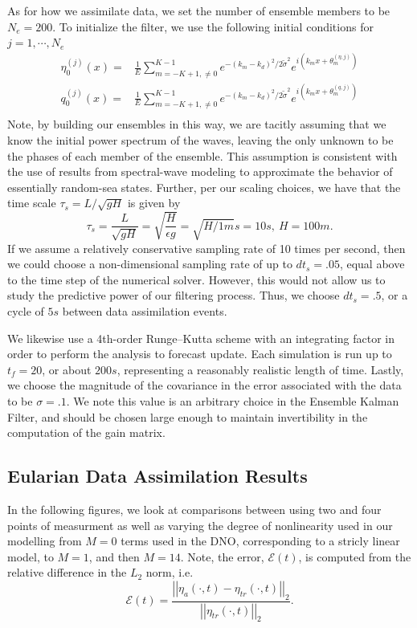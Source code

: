 As for how we assimilate data, we set the number of ensemble members to be $N_{e}=200$.  To initialize the filter, we use the following initial conditions for $j=1,\cdots,N_{e}$   
\begin{align*}
	\eta^{(j)}_{0}(x) = & \frac{1}{E}\sum_{m=-K+1,\neq0}^{K-1} e^{-\left(k_{m}-k_{d}\right)^{2}/2\tilde{\sigma}^{2}}e^{i(k_{m}x+\theta^{(\eta,j)}_{m})}\\
	q^{(j)}_{0}(x) = & \frac{1}{E}\sum_{m=-K+1,\neq0}^{K-1} e^{-\left(k_{m}-k_{d}\right)^{2}/2\tilde{\sigma}^{2}}e^{i(k_{m}x+\theta^{(q,j)}_{m})}\\
\end{align*}
Note, by building our ensembles in this way, we are tacitly assuming that we know the initial power spectrum of the waves, leaving the only unknown to be the phases of each member of the ensemble.  This assumption is consistent with the use of results from spectral-wave modeling to approximate the behavior of essentially random-sea states.  
Further, per our scaling choices, we have that the time scale $\tau_{s} = L/\sqrt{gH}$ is given by
\[
\tau_{s}=\frac{L}{\sqrt{gH}} = \sqrt{\frac{H}{\epsilon g}} = \sqrt{H/1m}s = 10 s, ~H=100 m.
\]
If we assume a relatively conservative sampling rate of 10 times per second, then we could choose a non-dimensional sampling rate of up to $dt_{s} = .05$, equal above to the time step of the numerical solver.  However, this would not allow us to study the predictive power of our filtering process.  Thus, we choose $dt_{s}=.5$, or a cycle of $5s$ between data assimilation events.  

We likewise use a 4th-order Runge--Kutta scheme with an integrating factor in order to perform the analysis to forecast update.  Each simulation is run up to $t_{f}=20$, or about $200s$, representing a reasonably realistic length of time.  Lastly, we choose the magnitude of the covariance in the error associated with the data to be $\sigma=.1$.  We note this value is an arbitrary choice in the Ensemble Kalman Filter, and should be chosen large enough to maintain invertibility in the computation of the gain matrix.  

\subsection*{Eularian Data Assimilation Results}
In the following figures, we look at comparisons between using two and four points of measurment as well as varying the degree of nonlinearity used in our modelling from $M=0$ terms used in the DNO, corresponding to a stricly linear model, to $M=1$, and then $M=14$.  Note, the error, $\mathcal{E}(t)$, is computed from the relative difference in the $L_{2}$ norm, i.e.    
\[
\mathcal{E}(t) = \frac{\left|\left|\eta_{a}(\cdot,t)-\eta_{tr}(\cdot,t)\right|\right|_{2}}{\left|\left|\eta_{tr}(\cdot,t)\right|\right|_{2}}.
\]

